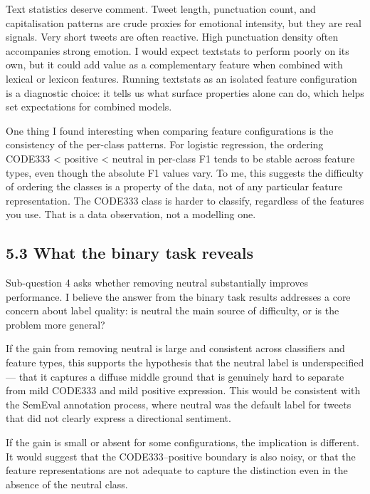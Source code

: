 \documentclass[12pt]{article}
\begin{document}
Text statistics deserve comment. Tweet length, punctuation count, and capitalisation patterns are crude proxies for emotional intensity, but they are real signals. Very short tweets are often reactive. High punctuation density often accompanies strong emotion. I would expect textstats to perform poorly on its own, but it could add value as a complementary feature when combined with lexical or lexicon features. Running textstats as an isolated feature configuration is a diagnostic choice: it tells us what surface properties alone can do, which helps set expectations for combined models.



One thing I found interesting when comparing feature configurations is the consistency of the per-class patterns. For logistic regression, the ordering CODE333 < positive < neutral in per-class F1 tends to be stable across feature types, even though the absolute F1 values vary. To me, this suggests the difficulty of ordering the classes is a property of the data, not of any particular feature representation. The CODE333 class is harder to classify, regardless of the features you use. That is a data observation, not a modelling one.



\subsection*{5.3 What the binary task reveals}



Sub-question 4 asks whether removing neutral substantially improves performance. I believe the answer from the binary task results addresses a core concern about label quality: is neutral the main source of difficulty, or is the problem more general?



If the gain from removing neutral is large and consistent across classifiers and feature types, this supports the hypothesis that the neutral label is underspecified --- that it captures a diffuse middle ground that is genuinely hard to separate from mild CODE333 and mild positive expression. This would be consistent with the SemEval annotation process, where neutral was the default label for tweets that did not clearly express a directional sentiment.



If the gain is small or absent for some configurations, the implication is different. It would suggest that the CODE333--positive boundary is also noisy, or that the feature representations are not adequate to capture the distinction even in the absence of the neutral class.
\end{document}
